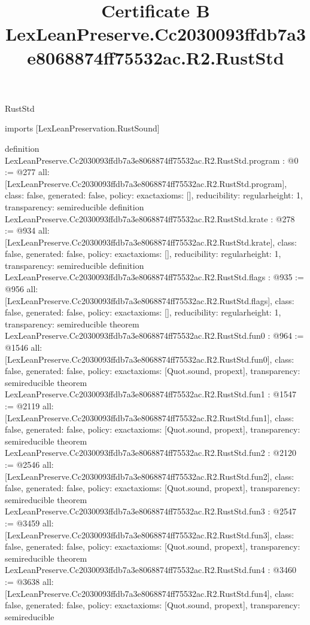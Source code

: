 \begin{lexlean}{RustStd}
\title{Certificate B LexLeanPreserve.Cc2030093ffdb7a3e8068874ff75532ac.R2.RustStd}
\begin{coremodule}
imports [LexLeanPreservation.RustSound]

definition LexLeanPreserve.Cc2030093ffdb7a3e8068874ff75532ac.R2.RustStd.program : @0 := @277 {
  all: [LexLeanPreserve.Cc2030093ffdb7a3e8068874ff75532ac.R2.RustStd.program],
  class: false,
  generated: false,
  policy: exact{axioms: []},
  reducibility: regular{height: 1},
  transparency: semireducible
}
definition LexLeanPreserve.Cc2030093ffdb7a3e8068874ff75532ac.R2.RustStd.krate : @278 := @934 {
  all: [LexLeanPreserve.Cc2030093ffdb7a3e8068874ff75532ac.R2.RustStd.krate],
  class: false,
  generated: false,
  policy: exact{axioms: []},
  reducibility: regular{height: 1},
  transparency: semireducible
}
definition LexLeanPreserve.Cc2030093ffdb7a3e8068874ff75532ac.R2.RustStd.flags : @935 := @956 {
  all: [LexLeanPreserve.Cc2030093ffdb7a3e8068874ff75532ac.R2.RustStd.flags],
  class: false,
  generated: false,
  policy: exact{axioms: []},
  reducibility: regular{height: 1},
  transparency: semireducible
}
theorem LexLeanPreserve.Cc2030093ffdb7a3e8068874ff75532ac.R2.RustStd.fun0 : @964 := @1546 {
  all: [LexLeanPreserve.Cc2030093ffdb7a3e8068874ff75532ac.R2.RustStd.fun0],
  class: false,
  generated: false,
  policy: exact{axioms: [Quot.sound, propext]},
  transparency: semireducible
}
theorem LexLeanPreserve.Cc2030093ffdb7a3e8068874ff75532ac.R2.RustStd.fun1 : @1547 := @2119 {
  all: [LexLeanPreserve.Cc2030093ffdb7a3e8068874ff75532ac.R2.RustStd.fun1],
  class: false,
  generated: false,
  policy: exact{axioms: [Quot.sound, propext]},
  transparency: semireducible
}
theorem LexLeanPreserve.Cc2030093ffdb7a3e8068874ff75532ac.R2.RustStd.fun2 : @2120 := @2546 {
  all: [LexLeanPreserve.Cc2030093ffdb7a3e8068874ff75532ac.R2.RustStd.fun2],
  class: false,
  generated: false,
  policy: exact{axioms: [Quot.sound, propext]},
  transparency: semireducible
}
theorem LexLeanPreserve.Cc2030093ffdb7a3e8068874ff75532ac.R2.RustStd.fun3 : @2547 := @3459 {
  all: [LexLeanPreserve.Cc2030093ffdb7a3e8068874ff75532ac.R2.RustStd.fun3],
  class: false,
  generated: false,
  policy: exact{axioms: [Quot.sound, propext]},
  transparency: semireducible
}
theorem LexLeanPreserve.Cc2030093ffdb7a3e8068874ff75532ac.R2.RustStd.fun4 : @3460 := @3638 {
  all: [LexLeanPreserve.Cc2030093ffdb7a3e8068874ff75532ac.R2.RustStd.fun4],
  class: false,
  generated: false,
  policy: exact{axioms: [Quot.sound, propext]},
  transparency: semireducible
}
\end{coremodule}
\end{lexlean}
